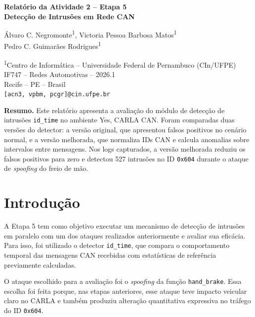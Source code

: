 \documentclass[12pt,a4paper]{article}
\begin{document}
\begin{center}
{\Large\bfseries Relat\'orio da Atividade 2 -- Etapa 5\\
Detec\c{c}\~ao de Intrus\~oes em Rede CAN\par}
\vspace{0.7cm}

{\normalsize
\'Alvaro C. Negromonte\textsuperscript{1},
Victoria Pessoa Barbosa Matos\textsuperscript{1}\\
Pedro C. Guimar\~aes Rodrigues\textsuperscript{1}\par}
\vspace{0.25cm}

{\normalsize
\textsuperscript{1}Centro de Inform\'atica -- Universidade Federal de Pernambuco (CIn/UFPE)\\
IF747 -- Redes Automotivas -- 2026.1\\
Recife -- PE -- Brasil\\
\texttt{[acn3, vpbm, pcgr]@cin.ufpe.br}\par}
\end{center}

\vspace{0.5cm}

\noindent\textbf{Resumo.}
Este relat\'orio apresenta a avalia\c{c}\~ao do m\'odulo de detec\c{c}\~ao de intrus\~oes
\texttt{id\_time} no ambiente Yes, CARLA CAN. Foram comparadas duas vers\~oes do
detector: a vers\~ao original, que apresentou falsos positivos no cen\'ario normal, e a
vers\~ao melhorada, que normaliza IDs CAN e calcula anomalias sobre intervalos entre
mensagens. Nos logs capturados, a vers\~ao melhorada reduziu os falsos positivos para
zero e detectou 527 intrus\~oes no ID \texttt{0x604} durante o ataque de
\textit{spoofing} do freio de m\~ao.

\section{Introdu\c{c}\~ao}

A Etapa 5 tem como objetivo executar um mecanismo de detec\c{c}\~ao de intrus\~oes em
paralelo com um dos ataques realizados anteriormente e avaliar sua efic\'acia. Para
isso, foi utilizado o detector \texttt{id\_time}, que compara o comportamento temporal das
mensagens CAN recebidas com estat\'isticas de refer\^encia previamente calculadas.

O ataque escolhido para a avalia\c{c}\~ao foi o \textit{spoofing} da fun\c{c}\~ao
\texttt{hand\_brake}. Essa escolha foi feita porque, nas etapas anteriores, esse ataque
teve impacto veicular claro no CARLA e tamb\'em produziu altera\c{c}\~ao quantitativa
expressiva no tr\'afego do ID \texttt{0x604}.
\end{document}
